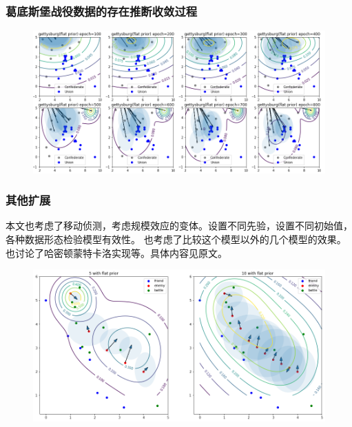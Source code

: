 \documentclass{beamer}
\begin{document}
\begin{frame}
\frametitle{葛底斯堡战役数据的存在推断收敛过程}

\begin{figure}[htb]
\includegraphics[width=0.99\linewidth]{gettysburg-init-beamer.png}
\label{fig:gettysburgInit}
\end{figure}


\end{frame}

\begin{frame}

\frametitle{其他扩展}

本文也考虑了移动侦测，考虑规模效应的变体。设置不同先验，设置不同初始值，各种数据形态检验模型有效性。
也考虑了比较这个模型以外的几个模型的效果。也讨论了哈密顿蒙特卡洛实现等。具体内容见原文。

\begin{figure}[htb]
\includegraphics[width=0.7\linewidth]{exist_density.png}
\label{fig:gettysburgInit}
\end{figure}

\end{frame}
\end{document}

